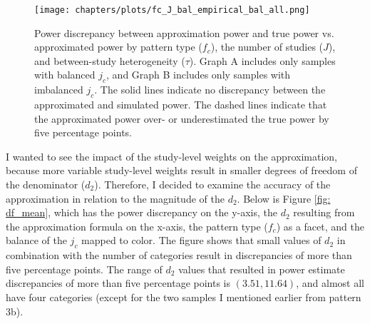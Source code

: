 \begin{figure}
    \centering
    \vspace{-5pt}\texttt{[image: chapters/plots/fc\_J\_bal\_empirical\_bal\_all.png]}\caption{Power discrepancy between approximation power and true power vs. approximated power by pattern type ($f_c$), the number of studies ($J$), and between-study heterogeneity ($\tau$). Graph A includes only samples with balanced $j_c$, and Graph B includes only samples with imbalanced $j_c$. The solid lines indicate no discrepancy between the approximated and simulated power. The dashed lines indicate that the approximated power over- or underestimated the true power by five percentage points.\label{fig: fc_J_bal_empirical_bal_all}}
    \vspace{-5pt}
\end{figure}


I wanted to see the impact of the study-level weights on the approximation, because more variable study-level weights result in smaller degrees of freedom of the denominator ($d_2$). Therefore, I decided to examine the accuracy of the approximation in relation to the magnitude of the $d_2$. Below is Figure \ref{fig: df_mean}, which has the power discrepancy on the y-axis, the $d_2$ resulting from the approximation formula on the x-axis, the pattern type ($f_c$) as a facet, and the balance of the $j_c$ mapped to color. The figure shows that small values of $d_2$ in combination with the number of categories result in discrepancies of more than five percentage points. The range of $d_2$ values that resulted in power estimate discrepancies of more than five percentage points is $(3.51, 11.64)$, and almost all have four categories (except for the two samples I mentioned earlier from pattern 3b). 

